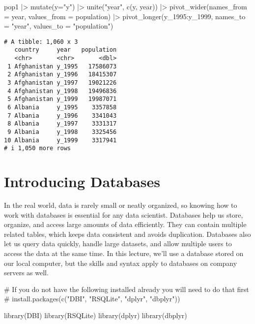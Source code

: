 \documentclass[
  letterpaper,
  DIV=11,
  numbers=noendperiod]{scrreprt}
\newenvironment{Shaded}{\begin{snugshade}}{\end{snugshade}}
\newcommand{\AttributeTok}[1]{\textcolor[rgb]{0.40,0.45,0.13}{#1}}
\newcommand{\CommentTok}[1]{\textcolor[rgb]{0.37,0.37,0.37}{#1}}
\newcommand{\FunctionTok}[1]{\textcolor[rgb]{0.28,0.35,0.67}{#1}}
\newcommand{\NormalTok}[1]{\textcolor[rgb]{0.00,0.23,0.31}{#1}}
\newcommand{\SpecialCharTok}[1]{\textcolor[rgb]{0.37,0.37,0.37}{#1}}
\newcommand{\StringTok}[1]{\textcolor[rgb]{0.13,0.47,0.30}{#1}}
\begin{document}
\begin{Shaded}
\begin{Highlighting}[]
\NormalTok{pop1 }\SpecialCharTok{|\textgreater{}} \FunctionTok{mutate}\NormalTok{(}\AttributeTok{y=}\StringTok{"y"}\NormalTok{) }\SpecialCharTok{|\textgreater{}} \FunctionTok{unite}\NormalTok{(}\StringTok{"year"}\NormalTok{, }\FunctionTok{c}\NormalTok{(y, year)) }\SpecialCharTok{|\textgreater{}}
    \FunctionTok{pivot\_wider}\NormalTok{(}\AttributeTok{names\_from =}\NormalTok{ year, }\AttributeTok{values\_from =}\NormalTok{ population) }\SpecialCharTok{|\textgreater{}}
    \FunctionTok{pivot\_longer}\NormalTok{(y\_1995}\SpecialCharTok{:}\NormalTok{y\_1999, }\AttributeTok{names\_to =} \StringTok{"year"}\NormalTok{, }\AttributeTok{values\_to =} \StringTok{"population"}\NormalTok{)}
\end{Highlighting}
\end{Shaded}

\begin{verbatim}
# A tibble: 1,060 x 3
   country     year   population
   <chr>       <chr>       <dbl>
 1 Afghanistan y_1995   17586073
 2 Afghanistan y_1996   18415307
 3 Afghanistan y_1997   19021226
 4 Afghanistan y_1998   19496836
 5 Afghanistan y_1999   19987071
 6 Albania     y_1995    3357858
 7 Albania     y_1996    3341043
 8 Albania     y_1997    3331317
 9 Albania     y_1998    3325456
10 Albania     y_1999    3317941
# i 1,050 more rows
\end{verbatim}


\chapter{Introducing Databases}\label{introducing-databases}

In the real world, data is rarely small or neatly organized, so knowing
how to work with databases is essential for any data scientist.
Databases help us store, organize, and access large amounts of data
efficiently. They can contain multiple related tables, which keeps data
consistent and avoids duplication. Databases also let us query data
quickly, handle large datasets, and allow multiple users to access the
data at the same time. In this lecture, we'll use a database stored on
our local computer, but the skills and syntax apply to databases on
company servers as well.

\begin{Shaded}
\begin{Highlighting}[]
\CommentTok{\# If you do not have the following installed already you will need to do that first}
\CommentTok{\# install.packages(c("DBI", "RSQLite", "dplyr", "dbplyr"))}

\FunctionTok{library}\NormalTok{(DBI)}
\FunctionTok{library}\NormalTok{(RSQLite)}
\FunctionTok{library}\NormalTok{(dplyr)}
\FunctionTok{library}\NormalTok{(dbplyr)}
\end{Highlighting}
\end{Shaded}
\end{document}

